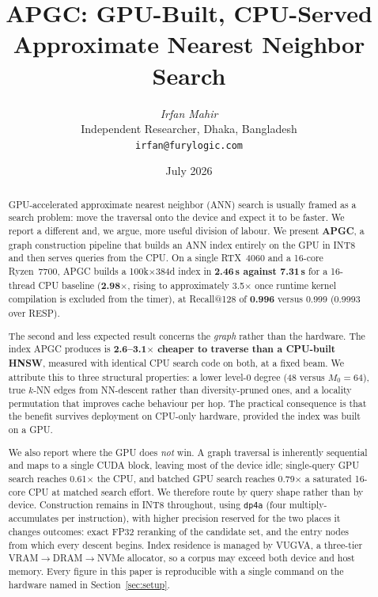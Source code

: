 \documentclass[11pt,twocolumn]{article}
\title{\textbf{\LARGE APGC: GPU-Built, CPU-Served\\[4pt]
Approximate Nearest Neighbor Search}}
\author{
    \textit{Irfan Mahir}\\[4pt]
    \small Independent Researcher, Dhaka, Bangladesh\\
    \small \texttt{irfan@furylogic.com}
}
\date{July 2026}
\begin{document}
\maketitle

\begin{abstract}
GPU-accelerated approximate nearest neighbor (ANN) search is usually framed as a
search problem: move the traversal onto the device and expect it to be faster.
We report a different and, we argue, more useful division of labour. We present
\textbf{APGC}, a graph construction pipeline that builds an ANN index entirely on
the GPU in INT8 and then serves queries from the CPU. On a single RTX~4060 and a
16-core Ryzen~7700, APGC builds a 100k$\times$384d index in \textbf{2.46\,s
against 7.31\,s} for a 16-thread CPU baseline (\textbf{2.98$\times$}, rising to
approximately 3.5$\times$ once runtime kernel compilation is excluded from the
timer), at Recall@128 of \textbf{0.996} versus 0.999 (0.9993 over RESP).

The second and less expected result concerns the \emph{graph} rather than the
hardware. The index APGC produces is \textbf{2.6--3.1$\times$ cheaper to traverse
than a CPU-built HNSW}, measured with identical CPU search code on both, at a
fixed beam. We attribute this to three structural properties: a lower level-0
degree (48 versus $M_0{=}64$), true $k$-NN edges from NN-descent rather than
diversity-pruned ones, and a locality permutation that improves cache behaviour
per hop. The practical consequence is that the benefit survives deployment on
CPU-only hardware, provided the index was built on a GPU.

We also report where the GPU does \emph{not} win. A graph traversal is
inherently sequential and maps to a single CUDA block, leaving most of the
device idle; single-query GPU search reaches 0.61$\times$ the CPU, and batched
GPU search reaches 0.79$\times$ a saturated 16-core CPU at matched search effort.
We therefore route by query shape rather than by device. Construction remains in
INT8 throughout, using \texttt{dp4a} (four multiply-accumulates per
instruction), with higher precision reserved for the two places it changes
outcomes: exact FP32 reranking of the candidate set, and the entry nodes from
which every descent begins. Index residence is managed by VUGVA, a three-tier
VRAM$\rightarrow$DRAM$\rightarrow$NVMe allocator, so a corpus may exceed both
device and host memory. Every figure in this paper is reproducible with a single
command on the hardware named in Section~\ref{sec:setup}.
\end{abstract}
\end{document}
